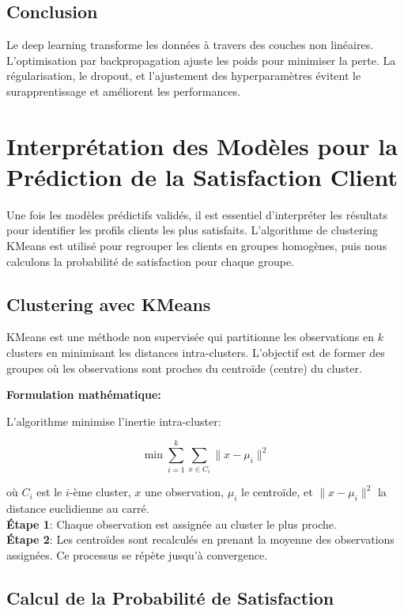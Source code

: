 \subsection{Conclusion}

Le deep learning transforme les données à travers des couches non linéaires. L'optimisation par backpropagation ajuste les poids pour minimiser la perte. La régularisation, le dropout, et l'ajustement des hyperparamètres évitent le surapprentissage et améliorent les performances.

\section{Interprétation des Modèles pour la Prédiction de la Satisfaction Client}

Une fois les modèles prédictifs validés, il est essentiel d'interpréter les résultats pour identifier les profils clients les plus satisfaits. L'algorithme de clustering KMeans est utilisé pour regrouper les clients en groupes homogènes, puis nous calculons la probabilité de satisfaction pour chaque groupe.

\subsection{Clustering avec KMeans}

KMeans est une méthode non supervisée qui partitionne les observations en \(k\) clusters en minimisant les distances intra-clusters. L'objectif est de former des groupes où les observations sont proches du centroïde (centre) du cluster.

\textbf{Formulation mathématique:}

L'algorithme minimise l'inertie intra-cluster:

\[
\min \sum_{i=1}^{k} \sum_{x \in C_i} \| x - \mu_i \|^2
\]

où \( C_i \) est le \(i\)-ème cluster, \( x \) une observation, \( \mu_i \) le centroïde, et \( \| x - \mu_i \|^2 \) la distance euclidienne au carré.\\
\textbf{Étape 1}: Chaque observation est assignée au cluster le plus proche.\\
\textbf{Étape 2}: Les centroïdes sont recalculés en prenant la moyenne des observations assignées. Ce processus se répète jusqu'à convergence.

\subsection{Calcul de la Probabilité de Satisfaction}


